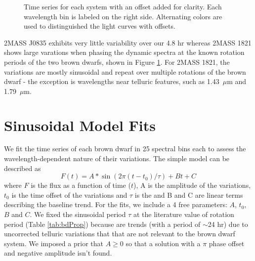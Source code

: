 \documentclass[twocolumn]{aastex6}
\begin{document}
\begin{figure}[!t]
\centering
{}
	\caption{Time series for each system with an offset added for clarity. Each wavelength bin is labeled on the right side. Alternating colors are used to distinguished the light curves with offsets.}
	\label{fig:tserPfold}
\end{figure} 

2MASS J0835 exhibits very little variability over our 4.8 hr whereas 2MASS 1821 shows large varations when phasing the dynamic spectra at the known rotation periods of the two brown dwarfs, shown in Figure \ref{fig:tserPfold}.
For 2MASS 1821, the variations are mostly sinusoidal and repeat over multiple rotations of the brown dwarf - the exception is wavelengths near telluric features, such as 1.43~$\mu$m and 1.79~$\mu$m.


\section{Sinusoidal Model Fits}\label{sec:ModelFits}

We fit the time series of each brown dwarf in 25 spectral bins each to assess the wavelength-dependent nature of their variations.
The simple model can be described as 
\begin{equation}
F(t) = A * \sin(2 \pi (t - t_0)/\tau) + B t + C
\end{equation}
where $F$ is the flux as a function of time ($t$), A is the amplitude of the variations, $t_0$ is the time offset of the variations and $\tau$ is the and B and C are linear terms describing the baseline trend.
For the fits, we include a 4 free parameters: $A$, $t_0$, $B$ and $C$.
We fixed the sinusoidal period $\tau$ at the literature value of rotation period (Table \ref{tab:bdProp}) because are trends (with a period of $\sim$24 hr) due to uncorrected telluric variations that that are not relevant to the brown dwarf system.
We imposed a prior that $A \geq 0$ so that a solution with a $\pi$ phase offset and negative amplitude isn't found.
\end{document}
